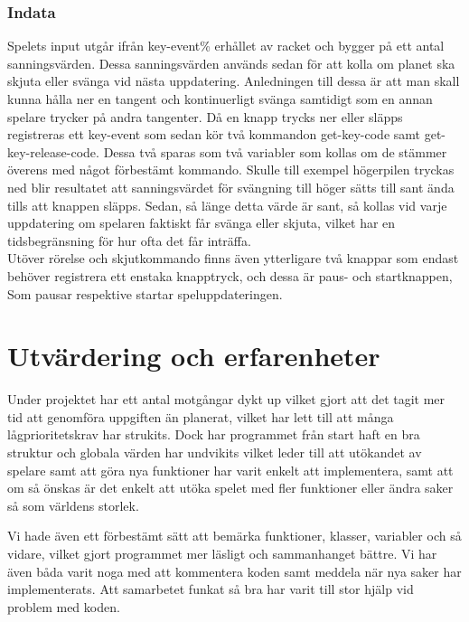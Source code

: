 \documentclass[12pt,a4paper]{article}
\begin{document}
\subsubsection{Indata} 
Spelets input utgår ifrån key-event\% erhållet av racket och bygger på ett antal sanningsvärden. Dessa sanningsvärden används sedan för att kolla om planet ska skjuta eller svänga vid nästa uppdatering. Anledningen till dessa är att man skall kunna hålla ner en tangent och kontinuerligt svänga samtidigt som en annan spelare trycker på andra tangenter. Då en knapp trycks ner eller släpps registreras ett key-event som sedan kör två kommandon get-key-code samt get-key-release-code. Dessa två sparas som två variabler som kollas om de stämmer överens med något förbestämt kommando. Skulle till exempel högerpilen tryckas ned blir resultatet att sanningsvärdet för svängning till höger sätts till sant ända tills att knappen släpps. Sedan, så länge detta värde är sant, så kollas vid varje uppdatering om spelaren faktiskt får svänga eller skjuta, vilket har en tidsbegränsning för hur ofta det får inträffa.\\

Utöver rörelse och skjutkommando finns även ytterligare två knappar som endast behöver registrera ett enstaka knapptryck, och dessa är paus- och startknappen, Som pausar respektive startar speluppdateringen.



\section{Utvärdering och erfarenheter}
    
Under projektet har ett antal motgångar dykt up vilket gjort att det tagit mer tid att genomföra uppgiften än planerat, vilket har lett till att många lågprioritetskrav har strukits. Dock har programmet från start haft en bra struktur och globala värden har undvikits vilket leder till att utökandet av spelare samt att göra nya funktioner har varit enkelt att implementera, samt att om så önskas är det enkelt att utöka spelet med fler funktioner eller ändra saker så som världens storlek.

Vi hade även ett förbestämt sätt att bemärka funktioner, klasser, variabler och så vidare, vilket gjort programmet mer läsligt och sammanhanget bättre.
Vi har även båda varit noga med att kommentera koden samt meddela när nya saker har implementerats.  Att samarbetet funkat så bra har varit till stor hjälp vid problem med koden. \\
\end{document}
